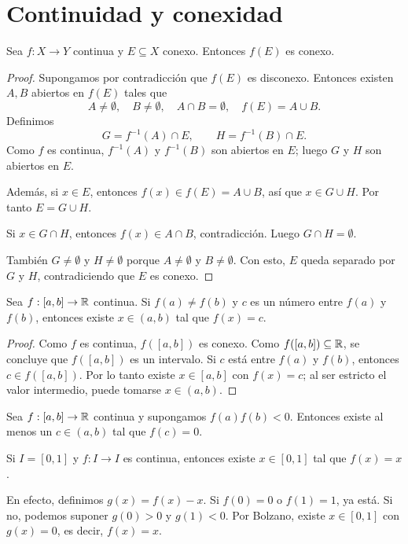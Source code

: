 \section{Continuidad y conexidad}

\begin{teorema}
Sea $f:X\to Y$ continua y $E\subseteq X$ conexo.
Entonces $f(E)$ es conexo.
\end{teorema}

\begin{proof}
Supongamos por contradicción que $f(E)$ es disconexo.
Entonces existen $A,B$ abiertos en $f(E)$ tales que
\[
A\neq\emptyset,\quad B\neq\emptyset,\quad A\cap B=\emptyset,\quad f(E)=A\cup B.
\]
Definimos
\[
G=f^{-1}(A)\cap E,
\qquad
H=f^{-1}(B)\cap E.
\]
Como $f$ es continua, $f^{-1}(A)$ y $f^{-1}(B)$ son abiertos en $E$; luego $G$ y $H$ son abiertos en $E$.

Además, si $x\in E$, entonces $f(x)\in f(E)=A\cup B$, así que $x\in G\cup H$. Por tanto $E=G\cup H$.

Si $x\in G\cap H$, entonces $f(x)\in A\cap B$, contradicción. Luego $G\cap H=\emptyset$.

También $G\neq\emptyset$ y $H\neq\emptyset$ porque $A\neq\emptyset$ y $B\neq\emptyset$.
Con esto, $E$ queda separado por $G$ y $H$, contradiciendo que $E$ es conexo.
\end{proof}

\begin{teorema}
Sea $f:[a,b]\to\mathbb{R}$ continua.
Si $f(a)\neq f(b)$ y $c$ es un número entre $f(a)$ y $f(b)$,
entonces existe $x\in(a,b)$ tal que $f(x)=c$.
\end{teorema}

\begin{proof}
Como $f$ es continua, $f([a,b])$ es conexo.
Como $f([a,b])\subseteq\mathbb{R}$, se concluye que $f([a,b])$ es un intervalo.
Si $c$ está entre $f(a)$ y $f(b)$, entonces $c\in f([a,b])$.
Por lo tanto existe $x\in[a,b]$ con $f(x)=c$; al ser estricto el valor intermedio, puede tomarse $x\in(a,b)$.
\end{proof}

\begin{teorema}
Sea $f:[a,b]\to\mathbb{R}$ continua y supongamos $f(a)f(b)<0$.
Entonces existe al menos un $c\in(a,b)$ tal que $f(c)=0$.
\end{teorema}

\begin{example}
Si $I=[0,1]$ y $f:I\to I$ es continua, entonces existe $x\in[0,1]$ tal que $f(x)=x$.

En efecto, definimos $g(x)=f(x)-x$. Si $f(0)=0$ o $f(1)=1$, ya está.
Si no, podemos suponer $g(0)>0$ y $g(1)<0$.
Por Bolzano, existe $x\in[0,1]$ con $g(x)=0$, es decir, $f(x)=x$.
\end{example}
